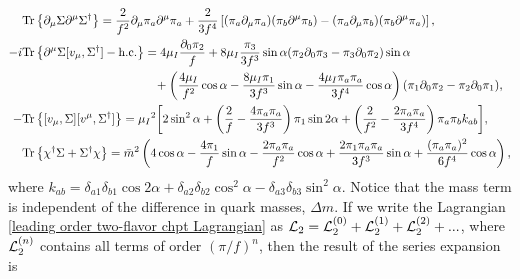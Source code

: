 \begin{align}
    & \text{Tr} \left\{ \partial_\mu \Sigma \partial^\mu \Sigma^\dagger \right\}
    = \frac{2}{f^2} \partial_\mu \pi_a \partial^\mu \pi_a
    + \frac{2}{3f^4}
    \left[
        (\pi_a\partial_\mu \pi_a)(\pi_b\partial^\mu \pi_b)
        -        
        (\pi_a\partial_\mu \pi_b)(\pi_b\partial^\mu \pi_a)
    \right], \\
    \nonumber
    -i  &\text{Tr} \left\{ \partial^\mu\Sigma[v_\mu,\Sigma^\dagger] - \text{h.c.} \right\}
    =
    4 \mu_I \frac{\partial_0\pi_2}{f}
    + 8 \mu_I \frac{\pi_3}{3f^3}\sin{\alpha}(
        \pi_2 \partial_0 \pi_3 - \pi_3 \partial_0 \pi_2
        ) \sin{\alpha}
    \\ & \quad \quad \quad \quad \quad \quad \quad \quad \quad \quad \quad
    +
    \left(
        \frac{4\mu_I}{f^2} \cos{\alpha}
        - \frac{8 \mu_I\pi_1}{3f^3} \sin{\alpha}
        - \frac{4 \mu_I \pi_a \pi_a} {3f^4}\cos{\alpha} 
    \right) 
    (\pi_1\partial_0 \pi_2 - \pi_2 \partial_0 \pi_1), \\
    - & \text{Tr} \left\{ [v_\mu,\Sigma][v^\mu,\Sigma^\dagger] \right\}
    = \mu_I{}^2
    \bigg[
        2 \sin^2{\alpha}
        +
        \left(
            \frac{2}{f} 
            - \frac{4\pi_a \pi_a}{3 f^3} 
        \right)
        \pi_1  \sin{2\alpha}
        + \left(
            \frac{2}{f^2}
            - \frac{2 \pi_a \pi_a}{3 f^4} 
        \right)
        \pi_a \pi_b k_{ab}
    \bigg], 
    \\
    & \text{Tr} \left\{ \chi^\dagger \Sigma + \Sigma^\dagger\chi \right\}
    = 
    \bar m^2 
    \left(
        4 \cos{\alpha} 
        - \frac{4 \pi_1}{f} \sin{\alpha} 
        - \frac{2 \pi_a \pi_a}{f^2} \cos{\alpha}
        + \frac{2 \pi_1 \pi_a \pi_a}{3 f^3} \sin{\alpha}
        + \frac{(\pi_a \pi_a)^2}{6 f^4}\cos{\alpha}
    \right), 
    \end{align}
where $k_{ab} =\delta_{a1} \delta_{b1} \cos{2\alpha}  + \delta_{a2}\delta_{b2}\cos^2{\alpha} - \delta_{a3}\delta_{b3} \sin^2{\alpha}$.
Notice that the mass term is independent of the difference in quark masses, $\Delta m$.
If we write the Lagrangian \autoref{leading order two-flavor chpt Lagrangian} as $\mathcal{L}_2 = \mathcal{L}_2^{(0)} + \mathcal{L}_2^{(1)} + \mathcal{L}_2^{(2)} +...$, where $\mathcal{L}_2^{(n)}$ contains all terms of order $(\pi/f)^n$, then the result of the series expansion is
